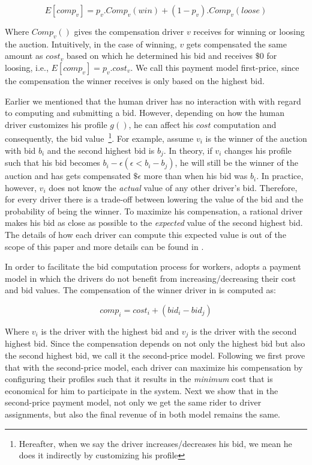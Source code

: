 \begin{equation*}
E[comp_v] = p_v.Comp_v(win) + (1 - p_v).Comp_v(loose)
\end{equation*}

Where $Comp_v()$ gives the compensation driver $v$ receives for winning or loosing the auction. Intuitively, in the case of winning, $v$ gets compensated the same amount as $cost_v$ based on which he determined his bid and receives $\$0$ for loosing, i.e., $E[comp_v] = p_v.cost_v$. We call this payment model first-price, since the compensation the winner receives is only based on the highest bid.

Earlier we mentioned that the human driver has no interaction with \fname with regard to computing and submitting a bid. However, depending on how the human driver customizes his profile $g()$, he can affect his $cost$ computation and consequently, the bid value~\footnote{Hereafter, when we say the driver increases/decreases his bid, we mean he does it indirectly by customizing his profile}. For example, assume $v_i$ is the winner of the auction with bid $b_i$ and the second highest bid is $b_j$. In theory, if $v_i$ changes his profile such that his bid becomes $b_i - \epsilon (\epsilon < b_i - b_j)$, he will still be the winner of the auction and has gets compensated $\$\epsilon$ more than when his bid was $b_i$. In practice, however, $v_i$ does not know the \textit{actual} value of any other driver's bid. Therefore, for every driver there is a trade-off between lowering the value of the bid and the probability of being the winner. To maximize his compensation, a rational driver makes his bid as close as possible to the \textit{expected} value of the second highest bid. The details of how each driver can compute this expected value is out of the scope of this paper and more details can be found in \cite{Vickery61}.

In order to facilitate the bid computation process for workers, \fname adopts a payment model in which the drivers do not benefit from increasing/decreasing their cost and bid values. The compensation of the winner driver in \fname is computed as:

\begin{equation*}
comp_i = cost_i + (bid_i - bid_j)
\end{equation*}

\noindent Where $v_i$ is the driver with the highest bid and $v_j$ is the driver with the second highest bid. Since the compensation depends on not only the highest bid but also the second highest bid, we call it the second-price model. Following we first prove that with the second-price model, each driver can maximize his compensation by configuring their profiles such that it results in the \textit{minimum} cost that is economical for him to participate in the system. Next we show that in the second-price payment model, not only we get the same rider to driver assignments, but also the final revenue of \fname in both model remains the same.

